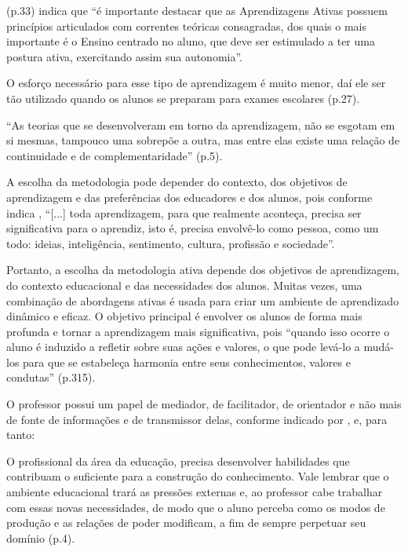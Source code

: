 (p.33) indica que ``é importante destacar que as Aprendizagens Ativas possuem princípios articulados com correntes teóricas consagradas, dos quais o mais importante é o Ensino centrado no aluno, que deve ser estimulado a ter uma postura ativa, exercitando assim sua autonomia''.

O esforço necessário para esse tipo de aprendizagem é muito menor, daí ele ser tão utilizado quando os alunos se preparam para exames escolares \cite{SOUSA2022} (p.27).

``As teorias que se desenvolveram em torno da aprendizagem, não se esgotam em si mesmas, tampouco uma sobrepõe a outra, mas entre elas existe uma relação de continuidade e de complementaridade'' \cite{LACERDA2023} (p.5).

A escolha da metodologia pode depender do contexto, dos objetivos de aprendizagem e das preferências dos educadores e dos alunos, pois conforme indica , ``[...] toda aprendizagem, para que realmente aconteça, precisa ser significativa para o aprendiz, isto é, precisa envolvê-lo como pessoa, como um todo: ideias, inteligência, sentimento, cultura, profissão e sociedade''.

Portanto, a escolha da metodologia ativa depende dos objetivos de aprendizagem, do contexto educacional e das necessidades dos alunos. Muitas vezes, uma combinação de abordagens ativas é usada para criar um ambiente de aprendizado dinâmico e eficaz. O objetivo principal é envolver os alunos de forma mais profunda e tornar a aprendizagem mais significativa, pois ``quando isso ocorre o aluno é induzido a refletir sobre suas ações e valores, o que pode levá-lo a mudá-los para que se estabeleça harmonia entre seus conhecimentos, valores e condutas'' \cite{FRASSON2019} (p.315).

O professor possui um papel de mediador, de facilitador, de orientador e não mais de fonte de informações e de transmissor delas, conforme indicado por 
, e, para tanto:

\begin{citacao}
    O profissional da área da educação, precisa desenvolver habilidades que contribuam o suficiente para a construção do conhecimento. Vale lembrar que o ambiente educacional trará as pressões externas e, ao professor cabe trabalhar com essas novas necessidades, de modo que o aluno perceba como os modos de produção e as relações de poder modificam, a fim de sempre perpetuar seu domínio \cite{NathBragaTeixeira2017} (p.4).
\end{citacao}

